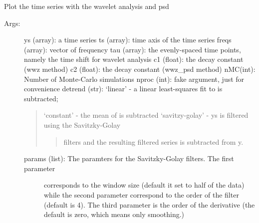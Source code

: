\documentclass[letterpaper,10pt,english]{sphinxmanual}
\begin{document}
\begin{fulllineitems}
\label{\detokenize{Spectral:pyleoclim.Spectral.plot_summary}}
Plot the time series with the wavelet analysis and psd
\begin{description}
\item[{Args:}] \leavevmode
ys (array): a time series
ts (array): time axis of the time series
freqs (array): vector of frequency
tau (array): the evenly-spaced time points, namely the time shift for wavelet analysis
c1 (float): the decay constant (wwz method)
c2 (float): the decay constant (wwz\_psd method)
nMC(int): Number of Monte-Carlo simulations
nproc (int): fake argument, just for convenience
detrend (str): ‘linear’ - a linear least-squares fit to  is subtracted;
\begin{quote}

‘constant’ - the mean of  is subtracted
‘savitzy-golay’ - ys is filtered using the Savitzky-Golay
\begin{quote}

filters and the resulting filtered series is subtracted from y.
\end{quote}
\end{quote}
\begin{description}
\item[{params (list): The paramters for the Savitzky-Golay filters. The first parameter}] \leavevmode
corresponds to the window size (default it set to half of the data)
while the second parameter correspond to the order of the filter
(default is 4). The third parameter is the order of the derivative
(the default is zero, which means only smoothing.)

\end{description}


\end{description}
\end{fulllineitems}
\end{document}
